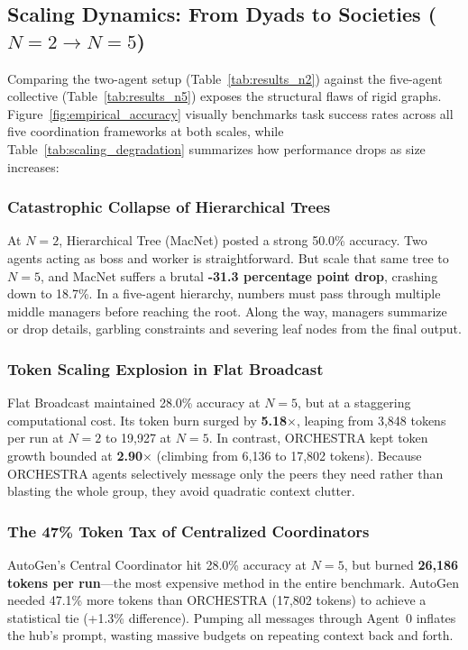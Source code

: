 \documentclass{ieeeaccess}
\begin{document}
\subsection{Scaling Dynamics: From Dyads to Societies ($N=2 \to N=5$)}
\label{subsec:scaling_analysis}
Comparing the two-agent setup (Table~\ref{tab:results_n2}) against the five-agent collective (Table~\ref{tab:results_n5}) exposes the structural flaws of rigid graphs. Figure~\ref{fig:empirical_accuracy} visually benchmarks task success rates across all five coordination frameworks at both scales, while Table~\ref{tab:scaling_degradation} summarizes how performance drops as size increases:

\subsubsection{Catastrophic Collapse of Hierarchical Trees}
At $N=2$, Hierarchical Tree (MacNet) posted a strong 50.0\% accuracy. Two agents acting as boss and worker is straightforward. But scale that same tree to $N=5$, and MacNet suffers a brutal \textbf{-31.3 percentage point drop}, crashing down to 18.7\%. In a five-agent hierarchy, numbers must pass through multiple middle managers before reaching the root. Along the way, managers summarize or drop details, garbling constraints and severing leaf nodes from the final output.

\subsubsection{Token Scaling Explosion in Flat Broadcast}
Flat Broadcast maintained 28.0\% accuracy at $N=5$, but at a staggering computational cost. Its token burn surged by \textbf{5.18$\times$}, leaping from 3,848 tokens per run at $N=2$ to 19,927 at $N=5$. In contrast, ORCHESTRA kept token growth bounded at \textbf{2.90$\times$} (climbing from 6,136 to 17,802 tokens). Because ORCHESTRA agents selectively message only the peers they need rather than blasting the whole group, they avoid quadratic context clutter.

\subsubsection{The 47\% Token Tax of Centralized Coordinators}
AutoGen's Central Coordinator hit 28.0\% accuracy at $N=5$, but burned \textbf{26,186 tokens per run}---the most expensive method in the entire benchmark. AutoGen needed 47.1\% more tokens than ORCHESTRA (17,802 tokens) to achieve a statistical tie (+1.3\% difference). Pumping all messages through Agent~0 inflates the hub's prompt, wasting massive budgets on repeating context back and forth.
\end{document}
